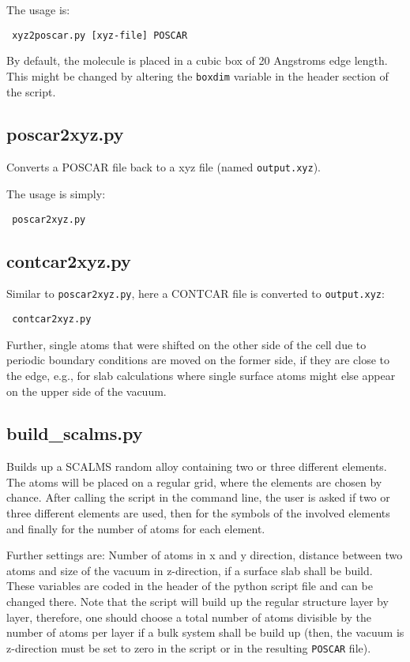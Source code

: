 \documentclass[a4paper,11pt]{article}
\begin{document}
The usage is:

\begin{verbatim}
 xyz2poscar.py [xyz-file] POSCAR
\end{verbatim}

By default, the molecule is placed in a cubic box of 20 Angstroms edge length.
This might be changed by altering the \texttt{boxdim} variable in the 
header section of the script.

\subsection{poscar2xyz.py}\label{poscar2xyz}

Converts a POSCAR file back to a xyz file (named \texttt{output.xyz}).

The usage is simply:

\begin{verbatim}
 poscar2xyz.py 
\end{verbatim}

\subsection{contcar2xyz.py}\label{contcar2xyz}

Similar to \texttt{poscar2xyz.py}, here a CONTCAR file is converted
to \texttt{output.xyz}:

\begin{verbatim}
 contcar2xyz.py
\end{verbatim}

Further, single atoms that were shifted on the other side of the cell due to
periodic boundary conditions are moved on the former side, if they are close
to the edge, e.g., for slab calculations where single surface atoms might else appear
on the upper side of the vacuum.

\subsection{build\_scalms.py}\label{build_scalms}

Builds up a SCALMS random alloy containing two or three different elements.
The atoms will be placed on a regular grid, where the elements are
chosen by chance.
After calling the script in the command line, the user is asked if two or
three different elements are used, then for the symbols of the involved
elements and finally for the number of atoms for each element.

Further settings are: Number of atoms in x and y direction, distance between
two atoms and size of the vacuum in z-direction, if a surface slab shall be build.
These variables are coded in the header of the python script file and can be
changed there. Note that the script will build up the regular structure layer by layer,
therefore, one should choose a total number of atoms divisible by the number of atoms 
per layer if a bulk system shall be build up (then, the vacuum is z-direction must be set to zero in 
the script or in the resulting  \texttt{POSCAR} file).
\end{document}
